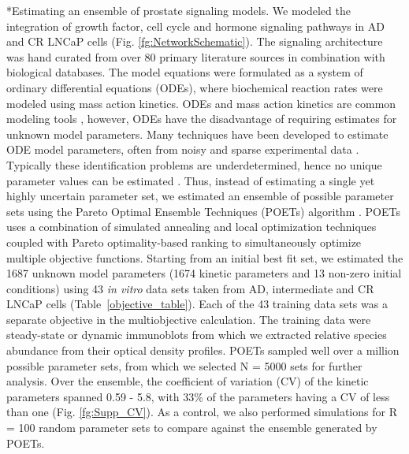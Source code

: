 \documentclass[12pt]{article}
\makeatletter
\renewcommand\subsection{\@startsection
	{subsection}{2}{0mm}
	{-0.05in}
	{-0.5\baselineskip}
	{\normalfont\normalsize\bfseries}}
\makeatother
\begin{document}
\subsection*{Estimating an ensemble of prostate signaling models.} 
We modeled the integration of growth factor, cell cycle and hormone signaling pathways in AD and CR LNCaP cells (Fig. \ref{fg:NetworkSchematic}). 
The signaling architecture was hand curated from over 80 primary literature sources in combination with biological databases.
The model equations were formulated as a system of ordinary differential equations (ODEs), where biochemical reaction rates were modeled using mass action kinetics.
ODEs and mass action kinetics are common modeling tools \citep{Wayman2013}, however, ODEs have the disadvantage of requiring estimates for unknown model parameters.
Many techniques have been developed to estimate ODE model parameters, often from noisy and sparse experimental data \citep{Moles:2003dn}.
Typically these identification problems are underdetermined, hence no unique parameter values can be estimated \citep{Villaverde:2014kl}.
Thus, instead of estimating a single yet highly uncertain parameter set, we estimated an ensemble of possible parameter sets using the Pareto Optimal Ensemble Techniques (POETs) algorithm \citep{Song2010}.
POETs uses a combination of simulated annealing and local optimization techniques coupled with Pareto optimality-based ranking to simultaneously optimize multiple objective functions.
Starting from an initial best fit set, we estimated the 1687 unknown model parameters (1674 kinetic parameters and 13 non-zero initial conditions) using 43 \textit{in vitro} data sets taken from AD, intermediate and CR LNCaP cells (Table~\ref{objective_table}). 
Each of the 43 training data sets was a separate objective in the multiobjective calculation. 
The training data were steady-state or dynamic immunoblots from which we extracted relative species abundance from their optical density profiles. 
POETs sampled well over a million possible parameter sets, from which we selected N = 5000 sets for further analysis. 
Over the ensemble, the coefficient of variation (CV) of the kinetic parameters spanned 0.59 - 5.8, with 33\% of the parameters having a CV of less than one (Fig. \ref{fg:Supp_CV}). 
As a control, we also performed simulations for R = 100 random parameter sets to compare against the ensemble generated by POETs. 
\end{document}
